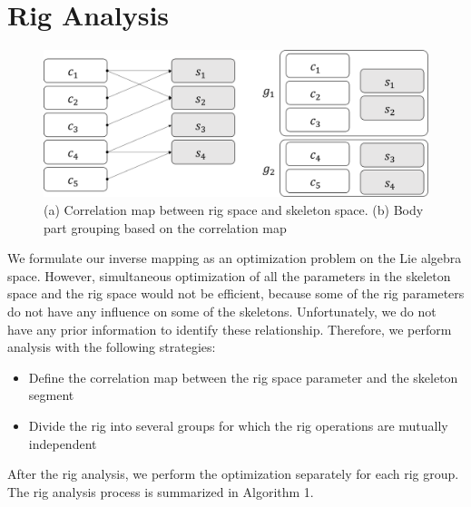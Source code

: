 \section{Rig Analysis}

\begin{figure}[ht]
  \centering
  \includegraphics[width=0.95\linewidth]{images/correlationMap}
  \caption{(a)  Correlation map between rig space and skeleton space. (b) Body part grouping based on the correlation map}
  \label{fig:correlationMap}
\end{figure}
We formulate our inverse mapping as an optimization problem on the Lie algebra space. However, simultaneous optimization of all the parameters in the skeleton space and the rig space would not be efficient, because some of the rig parameters do not have any influence on some of the skeletons. Unfortunately, we do not have any prior information to identify these relationship. Therefore, we perform analysis with the following strategies:
\begin{itemize}
	\item Define the correlation map between the rig space parameter and the skeleton segment
	\item Divide the rig into several groups for which the rig operations are mutually independent 
\end{itemize}
After the rig analysis, we perform the optimization separately for each rig group. The rig analysis process is summarized in Algorithm 1.
